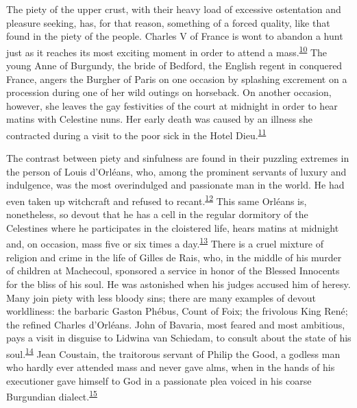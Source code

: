 The piety of the upper crust, with their heavy load of excessive
ostentation and pleasure seeking, has, for that reason, something of a
forced quality, like that found in the piety of the people. Charles V of
France is wont to abandon a hunt just as it reaches its most exciting
moment in order to attend a
mass.\textsuperscript{\protect\hypertarget{14_Chapter_Seven__THE_PIOUS_PERSONA.xhtmlux5cux23id_1004}{\protect\hyperlink{23_NOTES.xhtmlux5cux23page_421}{10}}}
The young Anne of Burgundy, the bride of Bedford, the English regent in
conquered France, angers the Burgher of Paris on one occasion by
splashing excrement on a procession during one of her wild outings on
horseback. On another occasion, however, she leaves the gay festivities
of the court at midnight in order to hear matins with Celestine nuns.
Her early death was caused by an illness she contracted during a visit
to the poor sick in the Hotel
Dieu.\textsuperscript{\protect\hypertarget{14_Chapter_Seven__THE_PIOUS_PERSONA.xhtmlux5cux23id_1002}{\protect\hyperlink{23_NOTES.xhtmlux5cux23id_1003}{11}}}

The contrast between piety and sinfulness are found in their puzzling
extremes in the person of Louis d'Orléans, who, among the prominent
servants of luxury and indulgence, was the most overindulged and
passionate man in the world. He had even taken up witchcraft and refused
to
recant.\textsuperscript{\protect\hypertarget{14_Chapter_Seven__THE_PIOUS_PERSONA.xhtmlux5cux23id_1000}{\protect\hyperlink{23_NOTES.xhtmlux5cux23id_1001}{12}}}
This same Orléans is, nonetheless, so devout that he has a cell in the
regular dormitory of the Celestines where he participates in the
cloistered life, hears matins at midnight and, on occasion, mass five or
six times a
day.\textsuperscript{\protect\hypertarget{14_Chapter_Seven__THE_PIOUS_PERSONA.xhtmlux5cux23id_998}{\protect\hyperlink{23_NOTES.xhtmlux5cux23id_999}{13}}}
There is a cruel mixture of religion and crime in the life of Gilles de
Rais, who, in the middle of his murder of children at Machecoul,
sponsored a service in honor of the Blessed Innocents for the bliss of
his soul. He was astonished when his judges accused him of heresy. Many
join piety with less bloody sins; there are many examples of devout
worldliness: the barbaric Gaston Phébus, Count of Foix; the frivolous
King René; the refined Charles d'Orléans. John of Bavaria, most feared
and most ambitious, pays a visit in
\protect\hypertarget{14_Chapter_Seven__THE_PIOUS_PERSONA.xhtmlux5cux23page_207}{}{}disguise
to Lidwina van Schiedam, to consult about the state of his
soul.\textsuperscript{\protect\hypertarget{14_Chapter_Seven__THE_PIOUS_PERSONA.xhtmlux5cux23id_996}{\protect\hyperlink{23_NOTES.xhtmlux5cux23id_997}{14}}}
Jean Coustain, the traitorous servant of Philip the Good, a godless man
who hardly ever attended mass and never gave alms, when in the hands of
his executioner gave himself to God in a passionate plea voiced in his
coarse Burgundian
dialect.\textsuperscript{\protect\hypertarget{14_Chapter_Seven__THE_PIOUS_PERSONA.xhtmlux5cux23id_994}{\protect\hyperlink{23_NOTES.xhtmlux5cux23id_995}{15}}}

